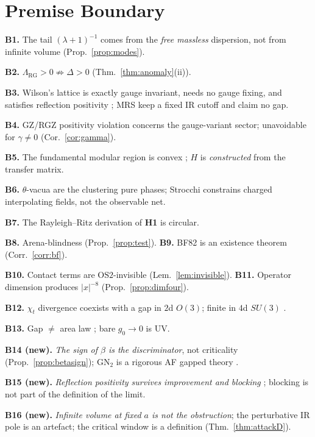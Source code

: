 \documentclass[11pt,a4paper]{article}
\theoremstyle{plain}
\theoremstyle{definition}
\theoremstyle{remark}
\newcommand{\OS}{\mathrm{OS}}\newcommand{\Gap}{\mathrm{Gap}}
\newcommand{\Chit}{\chi_t}
\renewcommand{\_}{\oldunderscore\allowbreak}
\begin{document}
\section{Premise Boundary}\label{sec:boundary}
\textbf{B1.} The tail $(\lambda+1)^{-1}$ comes from the \emph{free massless} dispersion, not from
infinite volume (Prop.~\ref{prop:modes}).

\textbf{B2.} $\Lambda_{\mathrm{RG}}>0\not\Rightarrow\Delta>0$ (Thm.~\ref{thm:anomaly}(ii)).

\textbf{B3.} Wilson's lattice is exactly gauge invariant, needs no gauge fixing, and satisfies
reflection positivity \cite{OsterwalderSeiler1978}; MRS \cite{MRS1993} keep a fixed IR cutoff and
claim no gap.

\textbf{B4.} GZ/RGZ positivity violation concerns the gauge-variant sector; unavoidable for
$\gamma\neq0$ (Cor.~\ref{cor:gamma}).

\textbf{B5.} The fundamental modular region is convex \cite{STSFranke1982,DAZ1991}; $H$ is
\emph{constructed} from the transfer matrix.

\textbf{B6.} $\theta$-vacua are the clustering pure phases; Strocchi \cite{Strocchi1977}
constrains charged interpolating fields, not the observable net.

\textbf{B7.} The Rayleigh--Ritz derivation of \textbf{H1} is circular.

\textbf{B8.} Arena-blindness (Prop.~\ref{prop:test}). \quad
\textbf{B9.} BF82 is an existence theorem (Corr.~\ref{corr:bf}).

\textbf{B10.} Contact terms are $\OS2$-invisible (Lem.~\ref{lem:invisible}). \quad
\textbf{B11.} Operator dimension produces $|x|^{-8}$ (Prop.~\ref{prop:dimfour}).

\textbf{B12.} $\Chit$ divergence coexists with a gap in $2$d $O(3)$; finite in $4$d $SU(3)$
\cite{Bietenholz2018,Ce2015}.

\textbf{B13.} Gap $\neq$ area law \cite{GKSW2015,ChatterjeeNotes}; bare $g_0\to0$ is UV.

\textbf{B14 (new).} \emph{The sign of $\beta$ is the discriminator}, not criticality
(Prop.~\ref{prop:betasign}); GN$_2$ is a rigorous AF gapped theory \cite{FMRS1986}.

\textbf{B15 (new).} \emph{Reflection positivity survives improvement and blocking}
\cite{LuscherWeisz1985,Symanzik1985}; blocking is not part of the definition of the limit.

\textbf{B16 (new).} \emph{Infinite volume at fixed $a$ is not the obstruction}; the perturbative
IR pole is an artefact; the critical window is a definition (Thm.~\ref{thm:attackD}).
\end{document}
